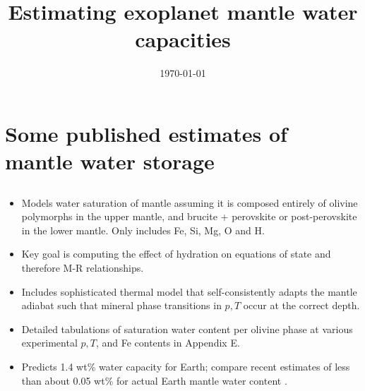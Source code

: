 \documentclass{article}
\title{Estimating exoplanet mantle water capacities}
\date{\today}
\begin{document}
 
\maketitle

\section{Some published estimates of mantle water storage}

\subsection{\citet{shahInternalWaterStorage2021}} 

\begin{itemize}
\item Models water saturation of mantle assuming it is composed entirely of olivine polymorphs in the upper mantle, and brucite + perovskite or post-perovskite in the lower mantle. Only includes Fe, Si, Mg, O
and H.
\item Key goal is computing the effect of hydration on equations of state and therefore M-R relationships.
\item Includes sophisticated thermal model that self-consistently adapts the mantle adiabat such that mineral phase transitions in $p, T$ occur at the correct depth.
\item Detailed tabulations of saturation water content per olivine phase at various experimental $p, T$, and Fe contents in Appendix E.
\item Predicts 1.4 wt\% water capacity for Earth; compare recent estimates of less than about 0.05 wt\% for actual Earth mantle water content \citep{ohtaniRoleWaterEarth2020}.


\end{itemize}
\end{document}
